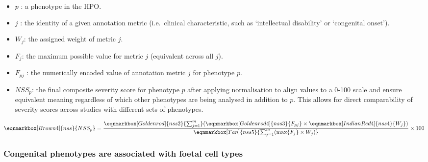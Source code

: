 \documentclass[
]{agujournal2019}
\begin{document}
\begin{itemize}
\item
  \(p\) : a phenotype in the HPO.
\item
  \(j\) : the identity of a given annotation metric (i.e.~clinical
  characteristic, such as `intellectual disability' or `congenital
  onset').
\item
  \(W_j\): the assigned weight of metric \(j\).
\item
  \(F_j\): the maximum possible value for metric \(j\) (equivalent
  across all \(j\)).
\item
  \(F_{pj}\) : the numerically encoded value of annotation metric \(j\)
  for phenotype \(p\).
\item
  \(NSS_p\): the final composite severity score for phenotype \(p\)
  after applying normalisation to align values to a 0-100 scale and
  ensure equivalent meaning regardless of which other phenotypes are
  being analysed in addition to \(p\). This allows for direct
  comparability of severity scores across studies with different sets of
  phenotypes.
\end{itemize}

\hfill\break
\hfill\break

\begin{equation*}
  \eqnmarkbox[Brown4]{nss}{NSS_p}
  =
  \frac{ 
    \eqnmarkbox[Goldenrod]{nss2}{\sum_{j=1}^{m}} 
    (
      \eqnmarkbox[Goldenrod4]{nss3}{F_{pj}}
      \times 
      \eqnmarkbox[IndianRed4]{nss4}{W_j}
    )
    }{
    \eqnmarkbox[Tan]{nss5}{\sum_{j=1}^{m}(\max\{F_j\} \times W_j)} 
  } \times 100
\end{equation*}

\hfill\break

\subsubsection{Congenital phenotypes are associated with foetal cell
types}\label{congenital-phenotypes-are-associated-with-foetal-cell-types-1}
\end{document}
